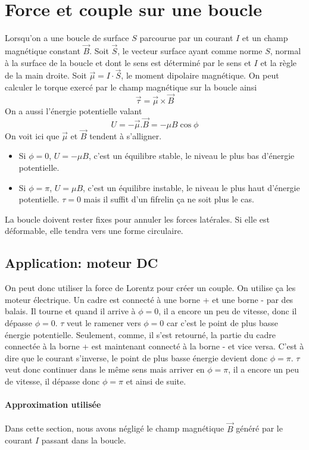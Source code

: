 \documentclass[11pt,a4paper]{article}
\begin{document}
\section{Force et couple sur une boucle}
Lorsqu'on a une boucle de surface $S$ parcourue par un courant $I$ et un champ magnétique constant $\vec B$.
Soit $\vec S$, le vecteur surface ayant comme norme $S$, normal à la surface de la boucle et dont le sens est déterminé par le sens et $I$ et la règle de la main droite.
Soit $\vec \mu = I \cdot \vec S$, le moment dipolaire magnétique.
On peut calculer le torque exercé par le champ magnétique sur la boucle ainsi
\[ \vec \tau = \vec \mu \times \vec B \]
On a aussi l'énergie potentielle valant
\[ U = -\vec \mu . \vec B = -\mu B \cos \phi \]
On voit ici que $\vec \mu$ et $\vec B$ tendent à s'alligner.
\begin{itemize}
	\item Si $\phi = 0$, $U = - \mu B$, c'est un équilibre stable, le niveau le plus bas d'énergie potentielle.
	\item Si $\phi = \pi$, $U = \mu B$, c'est un équilibre instable, le niveau le plus haut d'énergie potentielle.
		$\tau = 0$ mais il suffit d'un fifrelin ça ne soit plus le cas.
\end{itemize}

La boucle doivent rester fixes pour annuler les forces latérales.
Si elle est déformable, elle tendra vers une forme circulaire.

\subsection{Application: moteur DC}
On peut donc utiliser la force de Lorentz pour créer un couple.
On utilise ça les moteur électrique.
Un cadre est connecté à une borne + et une borne - par des balais.
Il tourne et quand il arrive à $\phi = 0$, il a encore un peu de vitesse, donc il dépasse $\phi = 0$.
$\tau$ veut le ramener vers $\phi = 0$ car c'est le point de plus basse énergie potentielle.
Seulement, comme, il s'est retourné, la partie du cadre connectée à la borne + est maintenant connecté à la borne - et vice versa.
C'est à dire que le courant s'inverse, le point de plus basse énergie devient donc $\phi = \pi$.
$\tau$ veut donc continuer dans le même sens mais arriver en $\phi = \pi$, il a encore un peu de vitesse, il dépasse donc $\phi = \pi$ et ainsi de suite.

\paragraph{Approximation utilisée}
Dans cette section, nous avons négligé le champ magnétique $\vec B$ généré par le courant $I$ passant dans la boucle.
\end{document}
